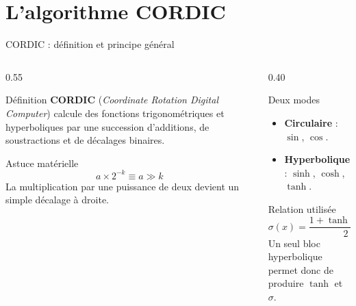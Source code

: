\documentclass[10pt,aspectratio=169]{beamer}
\begin{document}
\section{L'algorithme CORDIC}

\begin{frame}{CORDIC : définition et principe général}
\begin{columns}[T]
\begin{column}{0.55\textwidth}
  \begin{block}{Définition}
    \small
    \textbf{CORDIC} (\textit{Coordinate Rotation Digital Computer}) calcule des fonctions trigonométriques et hyperboliques par une succession d'additions, de soustractions et de décalages binaires.
  \end{block}
  \begin{exampleblock}{Astuce matérielle}
    \[
      a\times 2^{-k}\equiv a \gg k
    \]
    \centering\small
    La multiplication par une puissance de deux devient un simple décalage à droite.
  \end{exampleblock}
\end{column}
\begin{column}{0.40\textwidth}
  \begin{block}{Deux modes}
    \begin{itemize}\small
      \item \textbf{Circulaire} : \(\sin\), \(\cos\).
      \item \textbf{Hyperbolique} : \(\sinh\), \(\cosh\), \(\tanh\).
    \end{itemize}
  \end{block}
  \begin{alertblock}{Relation utilisée}
    \[
      \sigma(x)=\frac{1+\tanh(x/2)}{2}
    \]
    \centering\small
    Un seul bloc hyperbolique permet donc de produire \(\tanh\) et \(\sigma\).
  \end{alertblock}
\end{column}
\end{columns}
\end{frame}
\end{document}
